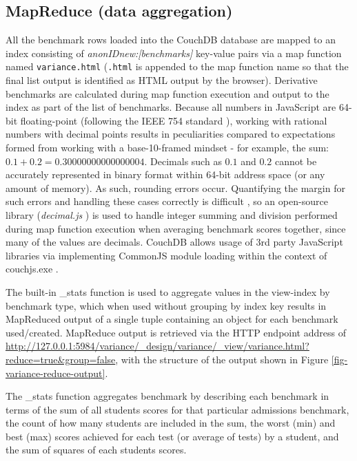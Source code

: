 \subsection{MapReduce (data aggregation)}
All the benchmark rows loaded into the CouchDB database are mapped to an index consisting of \textit{anonIDnew:[benchmarks]} key-value pairs via a map function named \texttt{variance.html} (\texttt{.html} is appended to the map function name so that the final list output is identified as HTML output by the browser). Derivative benchmarks are calculated during map function execution and output to the index as part of the list of benchmarks. Because all numbers in JavaScript are 64-bit floating-point (following the IEEE 754 standard \cite{floatingPoint}), working with rational numbers with decimal points results in peculiarities compared to expectations formed from working with a base-10-framed mindset - for example, the sum: $0.1 + 0.2 = 0.30000000000000004$. Decimals such as $0.1$ and $0.2$ cannot be accurately represented in binary format within 64-bit address space (or any amount of memory). As such, rounding errors occur. Quantifying the margin for such errors and handling these cases correctly is difficult \cite{Goldberg1991}, so an open-source library (\textit{decimal.js} \cite{decimaljs}) is used to handle integer summing and division performed during map function execution when averaging benchmark scores together, since many of the values are decimals. CouchDB allows usage of 3rd party JavaScript libraries via implementing CommonJS module loading within the context of couchjs.exe \cite{commonJsMapFn}.

The built-in \_stats function is used to aggregate values in the view-index by benchmark type, which when used without grouping by index key results in MapReduced output of a single tuple containing an object for each benchmark used/created. MapReduce output is retrieved via the HTTP endpoint address of \url{http://127.0.0.1:5984/variance/_design/variance/_view/variance.html?reduce=true&group=false}, with the structure of the output shown in Figure \ref{fig-variance-reduce-output}.



The \_stats function aggregates benchmark by describing each benchmark in terms of the sum of all students scores for that particular admissions benchmark, the count of how many students are included in the sum, the worst (min) and best (max) scores achieved for each test (or average of tests) by a student, and the sum of squares of each students scores.

